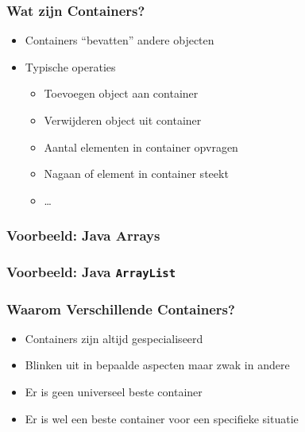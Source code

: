 \begin{frame}
  \frametitle{Wat zijn Containers?}
  \begin{itemize}
    \item Containers ``bevatten'' andere objecten
    \item Typische operaties
          \begin{itemize}
            \item Toevoegen object aan container
            \item Verwijderen object uit container
            \item Aantal elementen in container opvragen
            \item Nagaan of element in container steekt
            \item \dots
          \end{itemize}
  \end{itemize}
\end{frame}

\begin{frame}
  \frametitle{Voorbeeld: Java Arrays}
\end{frame}

\begin{frame}
  \frametitle{Voorbeeld: Java \texttt{ArrayList}}
\end{frame}

\begin{frame}
  \frametitle{Waarom Verschillende Containers?}
  \begin{itemize}
    \item Containers zijn altijd gespecialiseerd
    \item Blinken uit in bepaalde aspecten maar zwak in andere
    \item Er is geen universeel beste container
    \item Er is wel een beste container voor een specifieke situatie
  \end{itemize}
\end{frame}



